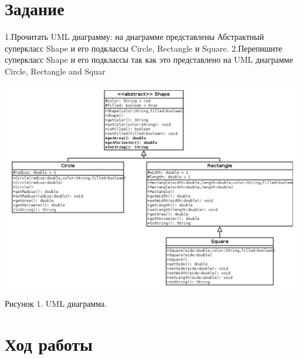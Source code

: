 \documentclass{article}
\begin{document}


\section{Задание}

1.Прочитать UML диаграмму: на диаграмме представлены Абстрактный суперкласс Shape и его подклассы Circle, Rectangle и Square.
2.Перепишите суперкласс Shape и его подклассы так как это представлено на UML диаграмме Circle, Rectangle and Squar

\includegraphics[width=1\linewidth]{pic.jpg}

\caption{Рисунок 1. UML диаграмма.}

\section{Ход работы}
\end{document}
